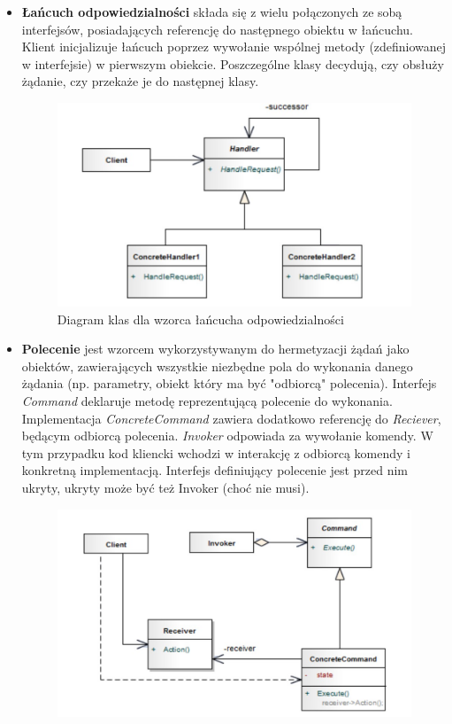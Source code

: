 \documentclass[a4paper,12pt,oneside]{book}
\begin{document}
                \begin{itemize}
                    \item \textbf{Łańcuch odpowiedzialności} składa się z wielu połączonych ze sobą interfejsów, posiadających referencję do następnego obiektu w łańcuchu. Klient inicjalizuje łańcuch poprzez wywołanie wspólnej metody (zdefiniowanej w interfejsie) w pierwszym obiekcie. Poszczególne klasy decydują, czy obsłuży żądanie, czy przekaże je do następnej klasy.
                    \begin{figure}[h]
                        \centering
                        \includegraphics[width=\textwidth/2]{images/chain_responsibilties.jpg}
                        \caption{Diagram klas dla wzorca łańcucha odpowiedzialności}
                        \label{fig:twojastara9}
                    \end{figure}
                    \item \textbf{Polecenie} jest wzorcem wykorzystywanym do hermetyzacji żądań jako obiektów, zawierających wszystkie niezbędne pola do wykonania danego żądania (np. parametry, obiekt który ma być "odbiorcą" polecenia). Interfejs \textit{Command} deklaruje metodę reprezentującą polecenie do wykonania. Implementacja \textit{ConcreteCommand} zawiera dodatkowo referencję do \textit{Reciever}, będącym odbiorcą polecenia. \textit{Invoker} odpowiada za wywołanie komendy. W tym przypadku kod kliencki wchodzi w interakcję z odbiorcą komendy i konkretną implementacją. Interfejs definiujący polecenie jest przed nim ukryty, ukryty może być też Invoker (choć nie musi).
                    \begin{figure}[h]
                        \centering
                        \includegraphics[width=\textwidth/2]{images/command.jpg}

\end{figure}
\end{itemize}
\end{document}

